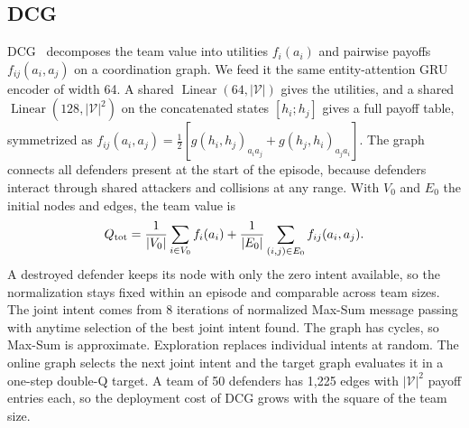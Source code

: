\subsection{DCG}
DCG~\cite{boehmer2020dcg} decomposes the team value into utilities $f_i(a_i)$ and pairwise payoffs $f_{ij}(a_i,a_j)$ on a coordination graph. We feed it the same entity-attention GRU encoder of width 64. A shared $\operatorname{Linear}(64,|\mathcal V|)$ gives the utilities, and a shared $\operatorname{Linear}(128,|\mathcal V|^2)$ on the concatenated states $[h_i;h_j]$ gives a full payoff table, symmetrized as $f_{ij}(a_i,a_j)=\tfrac12[g(h_i,h_j)_{a_ia_j}+g(h_j,h_i)_{a_ja_i}]$. The graph connects all defenders present at the start of the episode, because defenders interact through shared attackers and collisions at any range. With $V_0$ and $E_0$ the initial nodes and edges, the team value is
\begin{equation}
Q_{\rm tot}=\frac{1}{|V_0|}\sum_{i\in V_0}f_i(a_i)+\frac{1}{|E_0|}\sum_{(i,j)\in E_0}f_{ij}(a_i,a_j).
\label{eq:s-dcg}
\end{equation}
A destroyed defender keeps its node with only the zero intent available, so the normalization stays fixed within an episode and comparable across team sizes. The joint intent comes from 8 iterations of normalized Max-Sum message passing with anytime selection of the best joint intent found. The graph has cycles, so Max-Sum is approximate. Exploration replaces individual intents at random. The online graph selects the next joint intent and the target graph evaluates it in a one-step double-Q target. A team of 50 defenders has 1,225 edges with $|\mathcal V|^2$ payoff entries each, so the deployment cost of DCG grows with the square of the team size.

